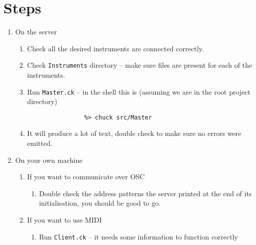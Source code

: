 \documentclass{article}
\begin{document}
\section{Steps}

\begin{enumerate} [\bf 1.]
\item {\large On the server}
	\begin{enumerate} [\bf i.]

		\item{Check all the desired instruments are connected correctly.}
		\item{Check \texttt{Instruments} directory -- make sure files are present for each of the instruments.}
		\item Run \texttt{Master.ck} -- in the shell this is (assuming we are in the root project directory)
		\begin{verbatim}
			    %> chuck src/Master
		\end{verbatim}
		\item  It will produce a lot of text, double check to make sure no errors were emitted.
	\end{enumerate}
\item {\large On your own machine}
	\begin{enumerate} [\bf i.]
		\item {If you want to communicate over OSC}
		\begin{enumerate} [\bf a.]
			\item{Double check the address patterns the server printed at the end of its initialisation, you should be good to go.}
		\end{enumerate}
		\item {If you want to use MIDI}
		\begin{enumerate} [\bf a.]
			\item{Run \texttt{Client.ck} -- it needs some information to function correctly}
		\end{enumerate}
	\end{enumerate}

\end{enumerate}
\end{document}
